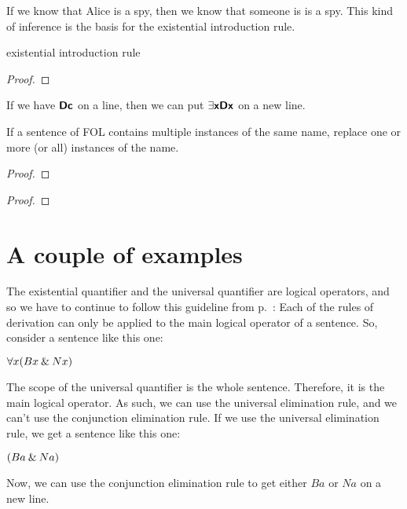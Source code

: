 If we know that Alice is a spy, then we know that someone is is a spy. 
This kind of inference is the basis for the existential introduction rule.

\begin{factboxy}{existential introduction rule}
\begin{proof}
	 
\end{proof}

\small{If we have $\bm{\mathsf{Dc}}$ on a line, then we can put $\exists \bm{\mathsf{x Dx}}$ on a new line.
\smallskip

If a sentence of FOL contains multiple instances of the same name, replace one or more (or all) instances of the name.}

\begin{proof}
	 
\end{proof}

\begin{proof}
	 
\end{proof}

\end{factboxy}


\section{A couple of examples}

The existential quantifier and the universal quantifier are logical operators, and so we have to continue to follow this guideline from p.~\pageref{rule-proofs-main-operator}: {Each of the rules of derivation can only be applied to the main logical operator of a sentence}.  
So, consider a sentence like this one:

\begin{ebullet}
\item[] $\forall x(Bx \mathbin{\&} Nx)$
\end{ebullet}
The scope of the universal quantifier is the whole sentence. Therefore, it is the main logical operator. As such, we can use the universal elimination rule, and we can't use the conjunction elimination rule. If we use the universal elimination rule, we get a sentence like this one:
\begin{ebullet}
\item[] $(Ba \mathbin{\&} Na)$
\end{ebullet}
Now, we can use the conjunction elimination rule to get either $Ba$ or $Na$ on a new line. %

